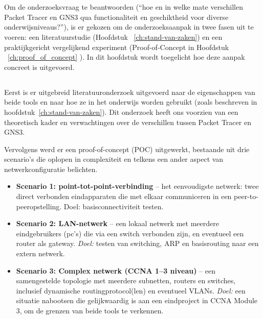 
\chapter{}%
\label{ch:methodologie}

Om de onderzoeksvraag te beantwoorden (“hoe en in welke mate verschillen Packet Tracer en GNS3 qua functionaliteit en geschiktheid voor diverse onderwijsniveaus?”), is er gekozen om de onderzoeksaanpak in twee fasen uit te voeren: een literatuurstudie (Hoofdstuk ~\ref{ch:stand-van-zaken}) en een praktijkgericht vergelijkend experiment (Proof-of-Concept in Hoofdstuk ~\ref{ch:proof_of_concept} ). In dit hoofdstuk wordt toegelicht hoe deze aanpak concreet is uitgevoerd.

\section{}
\label{sec:onderzoeksopzet}

Eerst is er uitgebreid literatuuronderzoek uitgevoerd naar de eigenschappen van beide tools en naar hoe ze in het onderwijs worden gebruikt (zoals beschreven in hoofdstuk~\ref{ch:stand-van-zaken}). Dit onderzoek heeft ons voorzien van een theoretisch kader en verwachtingen over de verschillen tussen Packet Tracer en GNS3.

\vspace{0.5cm}

Vervolgens werd er een proof-of-concept (POC) uitgewerkt, bestaande uit drie scenario’s die oplopen in complexiteit en telkens een ander aspect van netwerkconfiguratie belichten.

\begin{itemize}
    \item \textbf{Scenario 1: point-tot-point-verbinding} – het eenvoudigste netwerk: twee direct verbonden eindapparaten die met elkaar communiceren in een peer-to-peeropstelling. Doel: basisconnectiviteit testen.
    
    \item \textbf{Scenario 2: LAN-netwerk} – een lokaal netwerk met meerdere eindgebruikers (pc’s) die via een switch verbonden zijn, en eventueel een router als gateway. \textit{Doel:} testen van switching, ARP en basisrouting naar een extern netwerk.
    
    \item \textbf{Scenario 3: Complex netwerk (CCNA 1–3 niveau)} – een samengestelde topologie met meerdere subnetten, routers en switches, inclusief dynamische routingprotocol(len) en eventueel VLANs. \textit{Doel:} een situatie nabootsen die gelijkwaardig is aan een eindproject in CCNA Module 3, om de grenzen van beide tools te verkennen.
\end{itemize}

